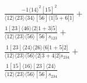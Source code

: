 \documentclass[varwidth, border=5pt]{standalone}
\begin{document}
\begin{my}
$\begin{gathered}
\scriptscriptstyle\frac{-1⟨14⟩^2[15]^2}{⟨12⟩⟨23⟩⟨34⟩[56]⟨1|5+6|1]}+\\
\scriptscriptstyle\frac{1[23]⟨46⟩⟨2|1+3|5]}{⟨12⟩⟨23⟩⟨56⟩[56]s_{123}}+\\
\scriptscriptstyle\frac{1[23]⟨24⟩⟨26⟩⟨6|1+5|2]}{⟨12⟩⟨23⟩⟨56⟩⟨2|3+4|2]s_{234}}+\\
\scriptscriptstyle\frac{1[15]⟨16⟩[23]⟨24⟩}{⟨12⟩⟨23⟩⟨56⟩[56]s_{234}}\phantom{+}
\end{gathered}$
\end{my}
\end{document}
